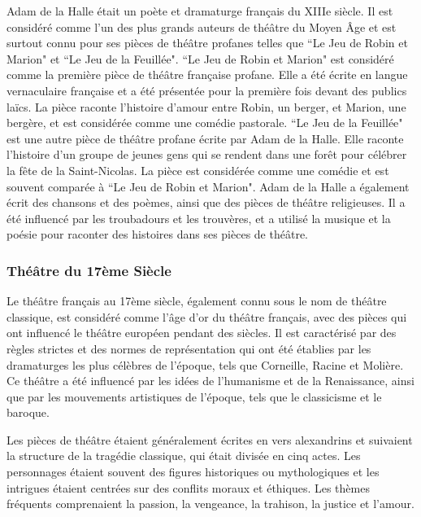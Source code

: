 \documentclass[UTF8,a4paper,12pt]{ctexart}
\numberwithin{equation}{section}
\newcommand{\mycite}[1]{\cite{#1}}
\begin{document}
Adam de la Halle était un poète et dramaturge français du XIIIe siècle. Il est considéré comme l'un des plus grands auteurs de théâtre du Moyen Âge et est surtout connu pour ses pièces de théâtre profanes telles que ``Le Jeu de Robin et Marion" et ``Le Jeu de la Feuillée"\mycite{huot1987transformations}. ``Le Jeu de Robin et Marion" est considéré comme la première pièce de théâtre française profane. Elle a été écrite en langue vernaculaire française et a été présentée pour la première fois devant des publics laïcs. La pièce raconte l'histoire d'amour entre Robin, un berger, et Marion, une bergère, et est considérée comme une comédie pastorale. ``Le Jeu de la Feuillée" est une autre pièce de théâtre profane écrite par Adam de la Halle. Elle raconte l'histoire d'un groupe de jeunes gens qui se rendent dans une forêt pour célébrer la fête de la Saint-Nicolas. La pièce est considérée comme une comédie et est souvent comparée à ``Le Jeu de Robin et Marion". Adam de la Halle a également écrit des chansons et des poèmes, ainsi que des pièces de théâtre religieuses. Il a été influencé par les troubadours et les trouvères, et a utilisé la musique et la poésie pour raconter des histoires dans ses pièces de théâtre. 

\subsubsection{Théâtre du 17ème Siècle}
Le théâtre français au 17ème siècle, également connu sous le nom de théâtre classique, est considéré comme l'âge d'or du théâtre français, avec des pièces qui ont influencé le théâtre européen pendant des siècles. Il est caractérisé par des règles strictes et des normes de représentation qui ont été établies par les dramaturges les plus célèbres de l'époque, tels que Corneille, Racine et Molière\mycite{rambert1861corneille}. Ce théâtre a été influencé par les idées de l'humanisme et de la Renaissance, ainsi que par les mouvements artistiques de l'époque, tels que le classicisme et le baroque\mycite{attinger1981esprit}.

Les pièces de théâtre étaient généralement écrites en vers alexandrins et suivaient la structure de la tragédie classique, qui était divisée en cinq actes. Les personnages étaient souvent des figures historiques ou mythologiques et les intrigues étaient centrées sur des conflits moraux et éthiques. Les thèmes fréquents comprenaient la passion, la vengeance, la trahison, la justice et l'amour\mycite{despois1874theatre}.
\end{document}
